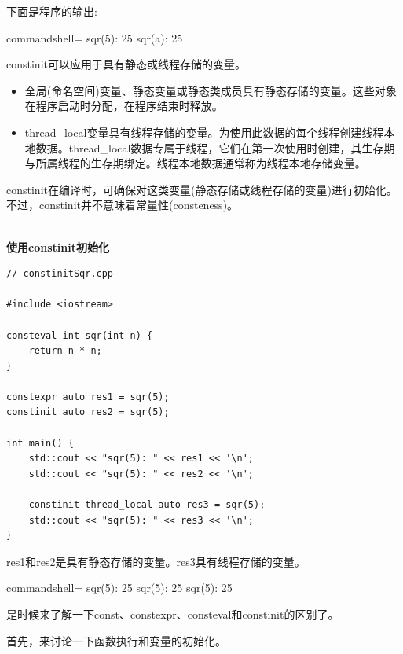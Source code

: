 下面是程序的输出:

\begin{tcblisting}{commandshell={}}
sqr(5): 25
sqr(a): 25
\end{tcblisting}


constinit可以应用于具有静态或线程存储的变量。

\begin{itemize}
\item 
全局(命名空间)变量、静态变量或静态类成员具有静态存储的变量。这些对象在程序启动时分配，在程序结束时释放。

\item 
thread\_local变量具有线程存储的变量。为使用此数据的每个线程创建线程本地数据。thread\_local数据专属于线程，它们在第一次使用时创建，其生存期与所属线程的生存期绑定。线程本地数据通常称为线程本地存储变量。
\end{itemize}

constinit在编译时，可确保对这类变量(静态存储或线程存储的变量)进行初始化。不过，constinit并不意味着常量性(consteness)。

\hspace*{\fill} \\ %
\noindent
\textbf{使用constinit初始化}
\begin{lstlisting}[style=styleCXX]
// constinitSqr.cpp

#include <iostream>

consteval int sqr(int n) {
	return n * n;
}

constexpr auto res1 = sqr(5);
constinit auto res2 = sqr(5);

int main() {
	std::cout << "sqr(5): " << res1 << '\n';
	std::cout << "sqr(5): " << res2 << '\n';
	
	constinit thread_local auto res3 = sqr(5);
	std::cout << "sqr(5): " << res3 << '\n';
}
\end{lstlisting}

res1和res2是具有静态存储的变量。res3具有线程存储的变量。

\begin{tcblisting}{commandshell={}}
sqr(5): 25
sqr(5): 25
sqr(5): 25
\end{tcblisting}

是时候来了解一下const、constexpr、consteval和constinit的区别了。

首先，来讨论一下函数执行和变量的初始化。


